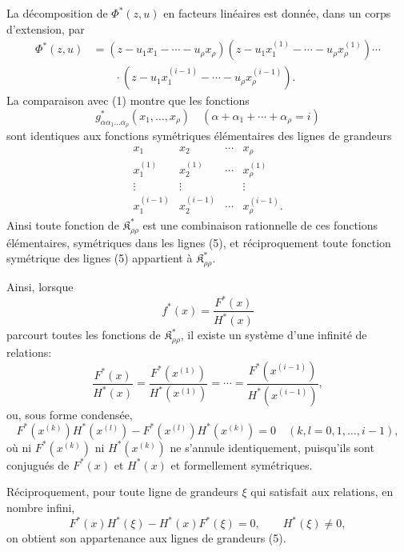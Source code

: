 \documentclass[11pt]{article}
\providecommand{\Kfield}{\mathfrak{K}}
\begin{document}
La décomposition de $\Phi^*(z,u)$ en facteurs linéaires est donnée, dans un corps d'extension, par
\begin{equation}
\begin{aligned}
 \Phi^*(z,u)&=(z-u_1x_1-\cdots-u_\rho x_\rho)
 (z-u_1x_1^{(1)}-\cdots-u_\rho x_\rho^{(1)})\cdots\\
 &\qquad\cdot
 (z-u_1x_1^{(i-1)}-\cdots-u_\rho x_\rho^{(i-1)}).
\end{aligned}
\tag{4}
\end{equation}
La comparaison avec (1) montre que les fonctions
\[
  g^*_{\alpha\alpha_1\ldots\alpha_\rho}(x_1,
  \ldots,x_\rho)\quad(\alpha+\alpha_1+\cdots+\alpha_\rho=i)
\]
sont identiques aux fonctions symétriques élémentaires des lignes de grandeurs
\begin{equation}
\begin{array}{cccc}
  x_1 & x_2 & \cdots & x_\rho\\
  x_1^{(1)} & x_2^{(1)} & \cdots & x_\rho^{(1)}\\
  \vdots & \vdots & & \vdots\\
  x_1^{(i-1)} & x_2^{(i-1)} & \cdots & x_\rho^{(i-1)}.
\end{array}
\tag{5}
\end{equation}
Ainsi toute fonction de $\Kfield^*_{\rho\rho}$ est une combinaison rationnelle de ces fonctions élémentaires, symétriques dans les lignes (5), et réciproquement toute fonction symétrique des lignes (5) appartient à $\Kfield^*_{\rho\rho}$.

Ainsi, lorsque
\[
  f^*(x)=\frac{F^*(x)}{H^*(x)}
\]
parcourt toutes les fonctions de $\Kfield^*_{\rho\rho}$, il existe un système d'une infinité de relations:
\begin{equation}
  \frac{F^*(x)}{H^*(x)}=
  \frac{F^*(x^{(1)})}{H^*(x^{(1)})}=\cdots=
  \frac{F^*(x^{(i-1)})}{H^*(x^{(i-1)})},
\tag{6}
\end{equation}
ou, sous forme condensée,
\[
  F^*(x^{(k)})H^*(x^{(l)})-
  F^*(x^{(l)})H^*(x^{(k)})=0
  \quad(k,l=0,1,\ldots,i-1),
\]
où ni $F^*(x^{(k)})$ ni $H^*(x^{(k)})$ ne s'annule identiquement, puisqu'ils sont conjugués de $F^*(x)$ et $H^*(x)$ et formellement symétriques.

Réciproquement, pour toute ligne de grandeurs $\xi$ qui satisfait aux relations, en nombre infini,
\begin{equation}
  F^*(x)H^*(\xi)-H^*(x)F^*(\xi)=0,
  \qquad H^*(\xi)\ne0,
\tag{7}
\end{equation}
on obtient son appartenance aux lignes de grandeurs (5).
\end{document}
